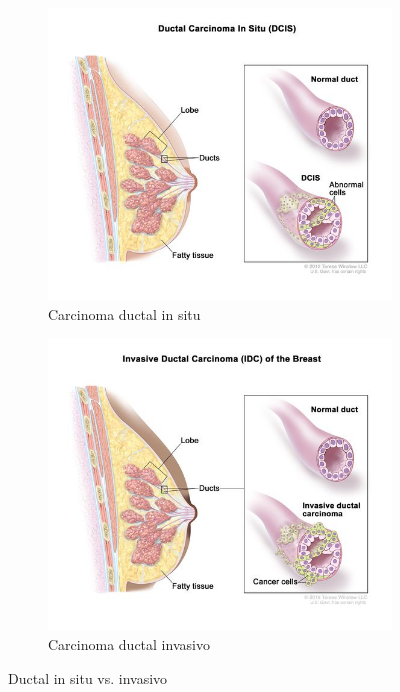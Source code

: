 \documentclass[a4paper,10pt]{book}
\begin{document}
\begin{figure}[h!]
    \centering
    \begin{subfigure}[c]{0.48\textwidth}
        \centering
        \includegraphics[width=\textwidth]{reports/assets/dcis.jpg}
        \caption{Carcinoma ductal in situ}
        \label{fig:dcis}
    \end{subfigure}
    \begin{subfigure}[c]{0.48\textwidth}
        \centering
        \includegraphics[width=\textwidth]{reports/assets/idc.jpg}
        \caption{Carcinoma ductal invasivo}
        \label{fig:idc}
    \end{subfigure}
    \caption{Ductal in situ vs. invasivo \cite{noauthor_nci_2011}}
    \label{fig:histological_types_one}
\end{figure}
\end{document}
